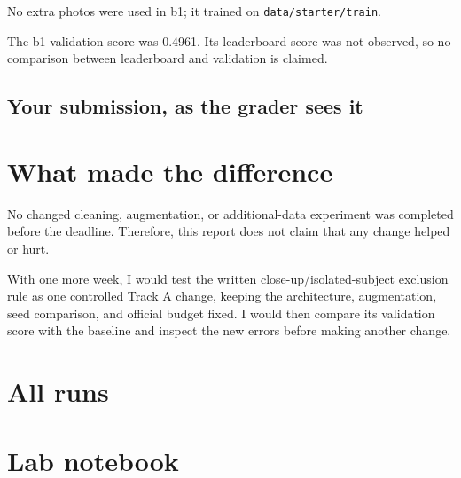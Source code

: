 \documentclass[11pt]{article}
\begin{document}
No extra photos were used in b1; it trained on \texttt{data/starter/train}.

The b1 validation score was 0.4961. Its leaderboard score was not observed, so no comparison between leaderboard and validation is claimed.

\subsection*{Your submission, as the grader sees it}

\section*{What made the difference}

No changed cleaning, augmentation, or additional-data experiment was completed before the deadline. Therefore, this report does not claim that any change helped or hurt.

With one more week, I would test the written close-up/isolated-subject exclusion rule as one controlled Track A change, keeping the architecture, augmentation, seed comparison, and official budget fixed. I would then compare its validation score with the baseline and inspect the new errors before making another change.

\section*{All runs}

\section*{Lab notebook}
\end{document}
